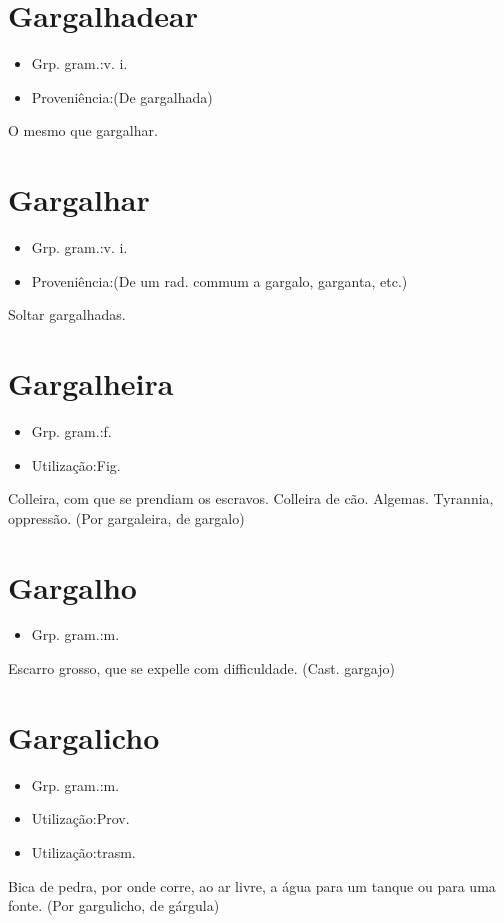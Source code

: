 \section{Gargalhadear}
\begin{itemize}
\item {Grp. gram.:v. i.}
\end{itemize}
\begin{itemize}
\item {Proveniência:(De \textunderscore gargalhada\textunderscore )}
\end{itemize}
O mesmo que \textunderscore gargalhar\textunderscore .
\section{Gargalhar}
\begin{itemize}
\item {Grp. gram.:v. i.}
\end{itemize}
\begin{itemize}
\item {Proveniência:(De um rad. commum a \textunderscore gargalo\textunderscore , \textunderscore garganta\textunderscore , etc.)}
\end{itemize}
Soltar gargalhadas.
\section{Gargalheira}
\begin{itemize}
\item {Grp. gram.:f.}
\end{itemize}
\begin{itemize}
\item {Utilização:Fig.}
\end{itemize}
Colleira, com que se prendiam os escravos.
Colleira de cão.
Algemas.
Tyrannia, oppressão.
(Por \textunderscore gargaleira\textunderscore , de \textunderscore gargalo\textunderscore )
\section{Gargalho}
\begin{itemize}
\item {Grp. gram.:m.}
\end{itemize}
Escarro grosso, que se expelle com difficuldade.
(Cast. \textunderscore gargajo\textunderscore )
\section{Gargalicho}
\begin{itemize}
\item {Grp. gram.:m.}
\end{itemize}
\begin{itemize}
\item {Utilização:Prov.}
\end{itemize}
\begin{itemize}
\item {Utilização:trasm.}
\end{itemize}
Bica de pedra, por onde corre, ao ar livre, a água para um tanque ou para uma fonte.
(Por \textunderscore gargulicho\textunderscore , de \textunderscore gárgula\textunderscore )
